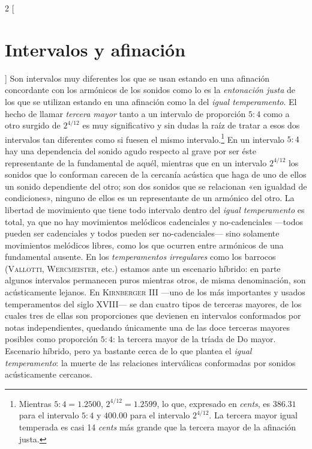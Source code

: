 \documentclass[a4paper,10pt]{article}
\begin{document}
\begin{multicols}{2}
[\section{Intervalos y afinación}\label{sec:intervalos-afinacion}]
  Son intervalos muy diferentes los que se usan estando en una afinación concordante con los armónicos de los sonidos como lo es la \emph{entonación justa} de los que se utilizan estando en una afinación como la del \emph{igual temperamento}. El hecho de llamar \emph{tercera mayor} tanto a un intervalo de proporción $5:4$ como a otro surgido de $2^{4/12}$ es muy significativo y sin dudas la raíz de tratar a esos dos intervalos tan diferentes como si fuesen el mismo intervalo.\footnote{Mientras $5:4=1.2500$, $2^{4/12}=1.2599$, lo que, expresado en \emph{cents}, es $386.31$ para el intervalo $5:4$ y $400.00$ para el intervalo $2^{4/12}$. La tercera mayor igual temperada es casi 14 \emph{cents} más grande que la tercera mayor de la afinación justa.} En un intervalo $5:4$ hay una dependencia del sonido agudo respecto al grave por ser éste representante de la fundamental de aquél, mientras que en un intervalo $2^{4/12}$ los sonidos que lo conforman carecen de la cercanía acústica que haga de uno de ellos un sonido dependiente del otro; son dos sonidos que se relacionan «en igualdad de condiciones», ninguno de ellos es un representante de un armónico del otro. La libertad de movimiento que tiene todo intervalo dentro del \emph{igual temperamento} es total, ya que no hay movimientos melódicos cadenciales y no-cadenciales ---todos pueden ser cadenciales y todos pueden ser no-cadenciales--- sino solamente movimientos melódicos libres, como los que ocurren entre armónicos de una fundamental ausente. En los \emph{temperamentos irregulares} como los barrocos (\textsc{Vallotti}, \textsc{Wercmeister}, etc.) estamos ante un escenario híbrido: en parte algunos intervalos permanecen puros mientras otros, de misma denominación, son acústicamente lejanos. En \textsc{Kirnberger III} ---uno de los más importantes y usados temperamentos del siglo XVIII--- se dan cuatro tipos de terceras mayores, de los cuales tres de ellas son proporciones que devienen en intervalos conformados por notas independientes, quedando únicamente una de las doce terceras mayores posibles como proporción $5:4$: la tercera mayor de la tríada de Do mayor. Escenario híbrido, pero ya bastante cerca de lo que plantea el \emph{igual temperamento}: la muerte de las relaciones interválicas conformadas por sonidos acústicamente cercanos.
\end{multicols}
\end{document}
